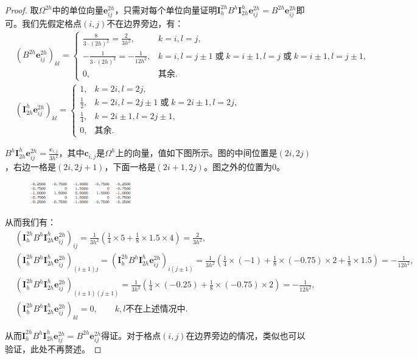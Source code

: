 \documentclass[lang=cn,10pt]{elegantbook}
\begin{document}
\begin{proof}
  取$\Omega^{2h}$中的单位向量$\mathbf{e}^{2h}_{ij}$，只需对每个单位向量证明$\mathbf{I}_h^{2h}B^h\mathbf{I}_{2h}^h\mathbf{e}^{2h}_{ij}=B^{2h}\mathbf{e}^{2h}_{ij}$即可。我们先假定格点$(i,j)$不在边界旁边，有：
  \begin{align*}
    &(B^{2h}\mathbf{e}^{2h}_{ij})_{kl}=\left\{
    \begin{array}{ll}
      \frac{8}{3\cdot (2h)^2}=\frac{2}{3h^2}, & k=i,l=j,\\
      -\frac{1}{3\cdot (2h)^2}=-\frac{1}{12h^2}, & k=i,l=j\pm 1 \; \text{或} \; k=i\pm 1,l=j \; \text{或} \; k=i\pm 1,l=j\pm 1,\\
      0, & \text{其余}.
    \end{array}\right.\\
    &(\mathbf{I}_{2h}^h\mathbf{e}^{2h}_{ij})_{kl}=\left\{
    \begin{array}{ll}
      1, & k=2i,l=2j,\\
      \frac{1}{2}, & k=2i,l=2j\pm 1 \; \text{或} \; k=2i\pm 1,l=2j,\\
      \frac{1}{4}, & k=2i\pm 1,l=2j\pm 1,\\
      0, & \text{其余}.
    \end{array}\right.
  \end{align*}

  $B^h\mathbf{I}_{2h}^h\mathbf{e}^{2h}_{ij}=\frac{\mathbf{c}_{i,j}}{3h^2}$，其中$\mathbf{c}_{i,j}$是$\Omega^h$上的向量，值如下图所示。图的中间位置是$(2i,2j)$，右边一格是$(2i,2j+1)$，下面一格是$(2i+1,2j)$。图之外的位置为$0$。

  \begin{figure}[H]
    \centering
    \includegraphics[width=0.4\textwidth]{figure/2-t-4.png}
  \end{figure}

  从而我们有：
  \begin{align*}
    &(\mathbf{I}_{h}^{2h}B^h\mathbf{I}_{2h}^h\mathbf{e}^{2h}_{ij})_{ij}=\frac{1}{3h^2}\left(\frac{1}{4}\times 5 + \frac{1}{8}\times 1.5\times 4\right)=\frac{2}{3h^2},\\
    &(\mathbf{I}_{h}^{2h}B^h\mathbf{I}_{2h}^h\mathbf{e}^{2h}_{ij})_{(i\pm 1)j}=(\mathbf{I}_{h}^{2h}B^h\mathbf{I}_{2h}^h\mathbf{e}^{2h}_{ij})_{i(j\pm 1)} = \frac{1}{3h^2}\left(\frac{1}{4}\times (-1) + \frac{1}{8}\times (-0.75)\times 2+\frac{1}{8}\times 1.5\right)=-\frac{1}{12h^2},\\
    &(\mathbf{I}_{h}^{2h}B^h\mathbf{I}_{2h}^h\mathbf{e}^{2h}_{ij})_{(i\pm 1)(j\pm 1)}=\frac{1}{3h^2}\left(\frac{1}{4}\times (-0.25) + \frac{1}{8}\times (-0.75)\times 2\right)=-\frac{1}{12h^2},\\
    &(\mathbf{I}_{h}^{2h}B^h\mathbf{I}_{2h}^h\mathbf{e}^{2h}_{ij})_{kl}=0,\qquad k,l\text{不在上述情况中}.
  \end{align*}

  从而$\mathbf{I}_h^{2h}B^h\mathbf{I}_{2h}^h\mathbf{e}^{2h}_{ij}=B^{2h}\mathbf{e}^{2h}_{ij}$得证。对于格点$(i,j)$在边界旁边的情况，类似也可以验证，此处不再赘述。
\end{proof}
\end{document}
